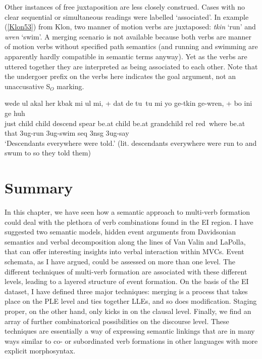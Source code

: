 Other instances of free juxtaposition are less closely construed. Cases with no clear sequential or simultaneous readings were labelled `associated'. In example (\ref{Klon53}) from Klon, two manner of motion verbs are juxtaposed: \textit{tkin} `run' and \textit{wren} `swim'. A merging scenario is not available because both verbs are manner of motion verbs without specified path semantics (and running and swimming are apparently hardly compatible in semantic terms anyway). Yet as the verbs are uttered together they are interpreted as being associated to each other. Note that the undergoer prefix on the verbs here indicates the goal argument, not an unaccusative S$_O$ marking. 

\ea \label{Klon53}
\gll wede ul akal her kbak mi ul mi, + dat de tu~tu mi yo ge-tkin ge-wren, + bo ini ge huh \\
just child child descend spear be.at child be.at grandchild \acs{rel} \acs{red}~where be.at that 3\acs{ug}-run 3\acs{ug}-swim \Acs{seq} 3\acs{nsg} 3\acs{ug}-say \\
\glft `Descendants everywhere were told.' (lit. descendants everywhere were run to and swum to so they told them) \ 
\z
\xe

\section{Summary} \label{sec:sum-sem}

In this chapter, we have seen how a semantic approach to multi-verb formation could deal with the plethora of verb combinations found in the EI region. I have suggested two semantic models, hidden event arguments from Davidsonian semantics and verbal decomposition along the lines of Van Valin and LaPolla, that can offer interesting insights into verbal interaction within MVCs. Event schemata, as I have argued, could be assessed on more than one level. The different techniques of multi-verb formation are associated with these different levels, leading to a layered structure of event formation. On the basis of the EI dataset, I have defined three major techniques: merging is a process that takes place on the PLE level and ties together LLEs, and so does modification. Staging proper, on the other hand, only kicks in on the clausal level. Finally, we find an array of further combinatorical possibilities on the discourse level. These techniques are essentially a way of expressing semantic linkings that are in many ways similar to co- or subordinated verb formations in other languages with more explicit morphosyntax.

